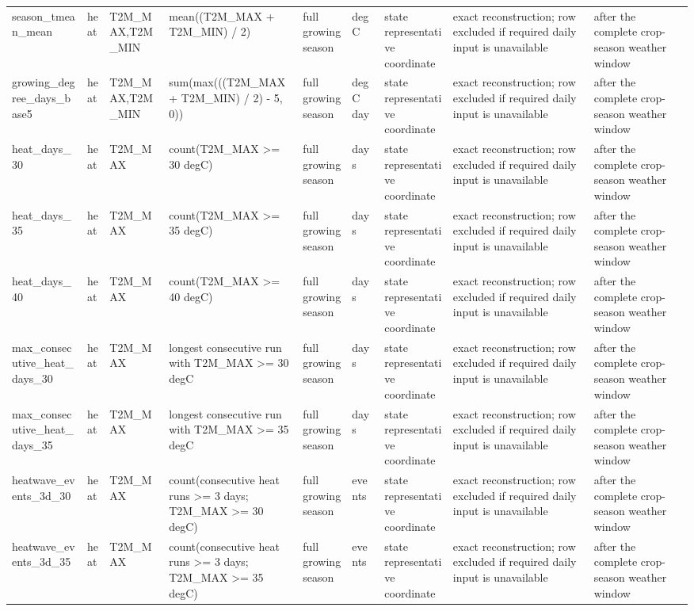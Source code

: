 \begin{tabular}{p{}p{}p{}p{}p{}p{}p{}p{}p{}}
season\_tmean\_mean & heat & T2M\_MAX,T2M\_MIN & mean((T2M\_MAX + T2M\_MIN) / 2) & full growing season & degC & state representative coordinate & exact reconstruction; row excluded if required daily input is unavailable & after the complete crop-season weather window \\
growing\_degree\_days\_base5 & heat & T2M\_MAX,T2M\_MIN & sum(max(((T2M\_MAX + T2M\_MIN) / 2) - 5, 0)) & full growing season & degC day & state representative coordinate & exact reconstruction; row excluded if required daily input is unavailable & after the complete crop-season weather window \\
heat\_days\_30 & heat & T2M\_MAX & count(T2M\_MAX >= 30 degC) & full growing season & days & state representative coordinate & exact reconstruction; row excluded if required daily input is unavailable & after the complete crop-season weather window \\
heat\_days\_35 & heat & T2M\_MAX & count(T2M\_MAX >= 35 degC) & full growing season & days & state representative coordinate & exact reconstruction; row excluded if required daily input is unavailable & after the complete crop-season weather window \\
heat\_days\_40 & heat & T2M\_MAX & count(T2M\_MAX >= 40 degC) & full growing season & days & state representative coordinate & exact reconstruction; row excluded if required daily input is unavailable & after the complete crop-season weather window \\
max\_consecutive\_heat\_days\_30 & heat & T2M\_MAX & longest consecutive run with T2M\_MAX >= 30 degC & full growing season & days & state representative coordinate & exact reconstruction; row excluded if required daily input is unavailable & after the complete crop-season weather window \\
max\_consecutive\_heat\_days\_35 & heat & T2M\_MAX & longest consecutive run with T2M\_MAX >= 35 degC & full growing season & days & state representative coordinate & exact reconstruction; row excluded if required daily input is unavailable & after the complete crop-season weather window \\
heatwave\_events\_3d\_30 & heat & T2M\_MAX & count(consecutive heat runs >= 3 days; T2M\_MAX >= 30 degC) & full growing season & events & state representative coordinate & exact reconstruction; row excluded if required daily input is unavailable & after the complete crop-season weather window \\
heatwave\_events\_3d\_35 & heat & T2M\_MAX & count(consecutive heat runs >= 3 days; T2M\_MAX >= 35 degC) & full growing season & events & state representative coordinate & exact reconstruction; row excluded if required daily input is unavailable & after the complete crop-season weather window \\

\end{tabular}
